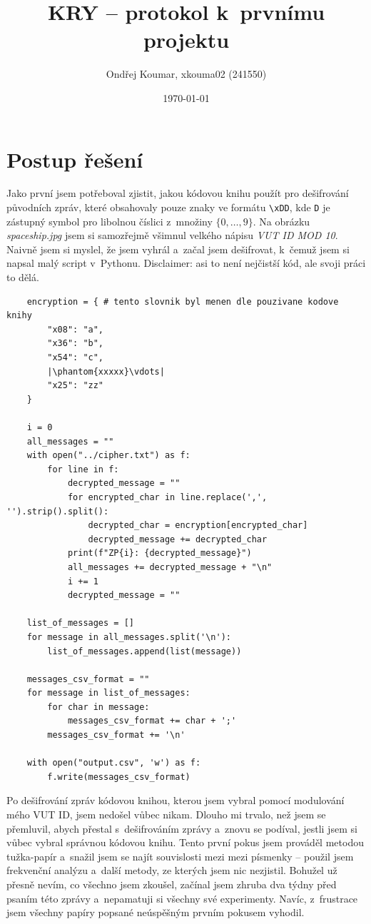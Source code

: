 \documentclass[a4paper, 11pt]{article}
\title{\huge KRY -- protokol k~prvnímu projektu}
\author{Ondřej Koumar, xkouma02 (241550)}
\date{\today}
\begin{document}
\maketitle

\section{Postup řešení}\label{kap:postup_reseni}

Jako první jsem potřeboval zjistit, jakou kódovou knihu použít pro dešifrování původních zpráv, které obsahovaly pouze znaky ve formátu \texttt{\textbackslash xDD}, kde \texttt{D} je zástupný symbol pro libolnou číslici z~množiny $\{0, \ldots, 9\}$.
Na obrázku \emph{spaceship.jpg} jsem si samozřejmě všimnul velkého nápisu \emph{VUT ID MOD 10}.
Naivně jsem si myslel, že jsem vyhrál a~začal jsem dešifrovat, k~čemuž jsem si napsal malý script v~Pythonu.
Disclaimer: asi to není nejčistší kód, ale svoji práci to dělá.

\label{code:desifrovaci_skript}
\begin{verbatim}
    encryption = { # tento slovnik byl menen dle pouzivane kodove knihy
        "x08": "a",
        "x36": "b",
        "x54": "c",
        |\phantom{xxxxx}\vdots|
        "x25": "zz"
    }

    i = 0
    all_messages = ""
    with open("../cipher.txt") as f:
        for line in f:
            decrypted_message = ""
            for encrypted_char in line.replace(',', '').strip().split():
                decrypted_char = encryption[encrypted_char]
                decrypted_message += decrypted_char
            print(f"ZP{i}: {decrypted_message}")
            all_messages += decrypted_message + "\n"
            i += 1
            decrypted_message = ""

    list_of_messages = []
    for message in all_messages.split('\n'):
        list_of_messages.append(list(message))
    
    messages_csv_format = ""
    for message in list_of_messages:
        for char in message:
            messages_csv_format += char + ';'
        messages_csv_format += '\n'
    
    with open("output.csv", 'w') as f:
        f.write(messages_csv_format)
\end{verbatim}

Po dešifrování zpráv kódovou knihou, kterou jsem vybral pomocí modulování mého VUT ID, jsem nedošel vůbec nikam.
Dlouho mi trvalo, než jsem se přemluvil, abych přestal s~dešifrováním zprá\-vy a~znovu se podíval, jestli jsem si vůbec vybral správnou kódovou knihu.
Tento první pokus jsem prováděl metodou tužka-papír a~snažil jsem se najít souvislosti mezi mezi písmenky -- použil jsem frekvenční analýzu a~další metody, ze kterých jsem nic nezjistil.
Bohužel už přesně nevím, co všechno jsem zkoušel, začínal jsem zhruba dva týdny před psaním této zprávy a~nepamatuji si všechny své experimenty.
Navíc, z~frustrace jsem všechny papíry popsané neúspěšným prvním pokusem vyhodil.
\end{document}
